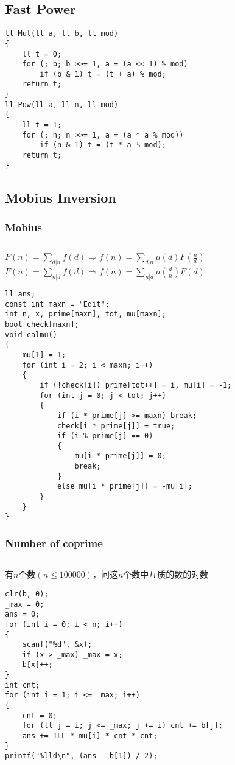 \documentclass[twoside]{article}
\begin{document}
\subsection{Fast Power}
\begin{lstlisting}
ll Mul(ll a, ll b, ll mod)
{
    ll t = 0;
    for (; b; b >>= 1, a = (a << 1) % mod)
        if (b & 1) t = (t + a) % mod;
    return t;
}
ll Pow(ll a, ll n, ll mod)
{
    ll t = 1;
    for (; n; n >>= 1, a = (a * a % mod))
        if (n & 1) t = (t * a % mod);
    return t;
}
\end{lstlisting}
\subsection{Mobius Inversion}
\subsubsection{Mobius}
\begin{lstlisting}
\end{lstlisting}
$F(n)=\sum_{d|n}f(d)\Rightarrow f(n)=\sum_{d|n}\mu(d)F(\frac{n}{d})$\\
$F(n)=\sum_{n|d}f(d)\Rightarrow f(n)=\sum_{n|d}\mu(\frac{d}{n})F(d)$
\begin{lstlisting}
ll ans;
const int maxn = "Edit";
int n, x, prime[maxn], tot, mu[maxn];
bool check[maxn];
void calmu()
{
    mu[1] = 1;
    for (int i = 2; i < maxn; i++)
    {
        if (!check[i]) prime[tot++] = i, mu[i] = -1;
        for (int j = 0; j < tot; j++)
        {
            if (i * prime[j] >= maxn) break;
            check[i * prime[j]] = true;
            if (i % prime[j] == 0)
            {
                mu[i * prime[j]] = 0;
                break;
            }
            else mu[i * prime[j]] = -mu[i];
        }
    }
}
\end{lstlisting}
\subsubsection{Number of coprime}
\begin{lstlisting}
\end{lstlisting}
有$n$个数$(n \leq 100000)$，问这$n$个数中互质的数的对数
\begin{lstlisting}
clr(b, 0);
_max = 0;
ans = 0;
for (int i = 0; i < n; i++)
{
    scanf("%d", &x);
    if (x > _max) _max = x;
    b[x]++;
}
int cnt;
for (int i = 1; i <= _max; i++)
{
    cnt = 0;
    for (ll j = i; j <= _max; j += i) cnt += b[j];
    ans += 1LL * mu[i] * cnt * cnt;
}
printf("%lld\n", (ans - b[1]) / 2);
\end{lstlisting}
\end{document}
